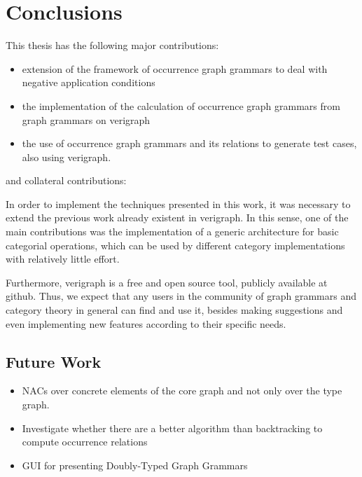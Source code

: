 \chapter{Conclusions}\label{ch:conclusions}

This thesis has the following major contributions:

\begin{itemize}
  \item extension of the framework of occurrence graph grammars to deal with negative application conditions
  \item the implementation of the calculation of occurrence graph grammars from graph grammars on verigraph
  \item the use of occurrence graph grammars and its relations to generate test cases, also using verigraph.
\end{itemize}

and collateral contributions:

  In order to implement the techniques presented in this work, it was necessary to extend the previous work already existent in verigraph. In this sense, one of the main contributions was the implementation of a generic architecture for basic categorial operations, which can be used by different category implementations with relatively little effort.

    Furthermore, verigraph is a free and open source tool, publicly available at github. Thus, we expect that any users in the community of graph grammars and category theory in general can find and use it, besides making suggestions and even implementing new features according to their specific needs.

\section{Future Work}

\begin{itemize}
  \item NACs over concrete elements of the core graph and not only over the type graph. 
  \item Investigate whether there are a better algorithm than backtracking to compute occurrence relations
  \item GUI for presenting Doubly-Typed Graph Grammars

\end{itemize}

